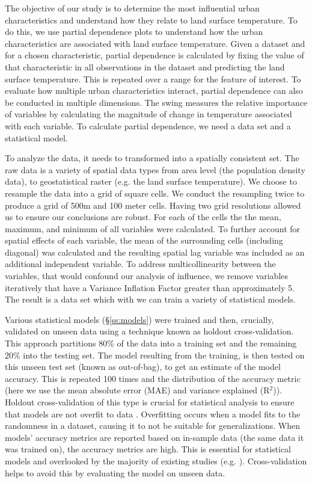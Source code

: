 \documentclass[final,3p,times,twocolumn,sort&compress]{elsarticle}
\begin{document}
The objective of our study is to determine the most influential urban characteristics and understand how they relate to land surface temperature.
To do this, we use partial dependence plots to understand how the urban characteristics are associated with land surface temperature.
Given a dataset and for a chosen characteristic, partial dependence is calculated by fixing the value of that characteristic in all observations in the dataset and predicting the land surface temperature. 
This is repeated over a range for the feature of interest.
To evaluate how multiple urban characteristics interact, partial dependence can also be conducted in multiple dimensions.
The swing \cite{Shortridge2015-ub} measures the relative importance of variables by calculating the magnitude of change in temperature associated with each variable.
To calculate partial dependence, we need a data set and a statistical model.

To analyze the data, it needs to transformed into a spatially consistent set.
The raw data is a variety of spatial data types from area level (the population density data), to geostatistical raster (e.g. the land surface temperature).
We choose to resample the data into a grid of square cells.
We conduct the resampling twice to produce a grid of 500m and 100 meter cells. 
Having two grid resolutions allowed us to ensure our conclusions are robust.
For each of the cells the the mean, maximum, and minimum of all variables were calculated. 
To further account for spatial effects of each variable, the mean of the surrounding cells (including diagonal) was calculated and the resulting spatial lag variable was included as an additional independent variable. 
To address multicollinearity between the variables, that would confound our analysis of influence, we remove variables iteratively that have a Variance Inflation Factor greater than approximately 5.
The result is a data set which with we can train a variety of statistical models.

Various statistical models (\S \ref{ss:models}) were trained and then, crucially, validated on unseen data using a technique known as holdout cross-validation. 
This approach partitions 80\% of the data into a training set and the remaining 20\% into the testing set.
The model resulting from the training, is then tested on this unseen test set (known as out-of-bag), to get an estimate of the model accuracy.
This is repeated 100 times and the distribution of the accuracy metric (here we use the mean absolute error (MAE) and variance explained (R$^2$)).
Holdout cross-validation of this type is crucial for statistical analysis to ensure that models are not overfit to data \cite{Geron2017-ek}.
Overfitting occurs when a model fits to the randomness in a dataset, causing it to not be suitable for generalizations. 
When models' accuracy metrics are reported based on in-sample data (the same data it was trained on), the accuracy metrics are high.
This is essential for statistical models and overlooked by the majority of existing studies (e.g. \cite{Zhou2014-wc, Peng2018-cp, Chun2017-mm, Chun2018-so,Wang2019-tree}).
Cross-validation helps to avoid this by evaluating the model on unseen data.
\end{document}
